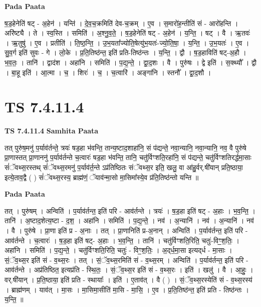 \documentclass[17pt]{extarticle}
\begin{document}
\textbf{Pada Paata} \newline

ष॒ड॒हेनेति॑ षट् - अ॒हेन॑ । यन्ति॑ । दे॒व॒च॒क्रमिति॑ देव-च॒क्रम् । ए॒व । स॒मारो॑ह॒न्तीति॑ सं - आरो॑हन्ति । अरि॑ष्ट्यै । ते । स्व॒स्ति । समिति॑ । अ॒श्नु॒व॒ते॒ । ष॒ड॒हेनेति॑ षट् - अ॒हेन॑ । य॒न्ति॒ । षट् । वै । ऋ॒तवः॑ । ऋ॒तुषु॑ । ए॒व । प्रतीति॑ । ति॒ष्ठ॒न्ति॒ । उ॒भ॒यता᳚ज्योति॒षेत्यु॑भ॒यतः॑-ज्यो॒ति॒षा॒ । य॒न्ति॒ । उ॒भ॒यतः॑ । ए॒व । सु॒व॒र्ग इति॑ सुवः - गे । लो॒के । प्र॒ति॒तिष्ठ॑न्त॒ इति॑ प्रति-तिष्ठ॑न्तः । य॒न्ति॒ । द्वौ । ष॒ड॒हाविति॑ षट्-अ॒हौ । भ॒व॒तः॒ । तानि॑ । द्वाद॑श । अहा॑नि । समिति॑ । प॒द्य॒न्ते॒ । द्वा॒द॒शः । वै । पुरु॑षः । द्वे इति॑ । स॒क्थ्यौ᳚ । द्वौ । बा॒हू इति॑ । आ॒त्मा । च॒ । शिरः॑ । च॒ । च॒त्वारि॑ । अङ्गा॑नि । स्तनौ᳚ । द्वा॒द॒शौ ।  \newline





\section{ TS 7.4.11.4 }

\textbf{TS 7.4.11.4 } \newline
\textbf{Samhita Paata} \newline

तत् पुरु॑ष॒मनु॑ प॒र्याव॑र्तन्ते॒ त्रयः॑ षड॒हा भ॑वन्ति॒ तान्य॒ष्टाद॒शाहा॑नि॒ सं प॑द्यन्ते॒ नवा॒न्यानि॒ नवा॒न्यानि॒ नव॒ वै पुरु॑षे प्रा॒णास्तत् प्रा॒णाननु॑ प॒र्याव॑र्तन्ते च॒त्वारः॑ षड॒हा भ॑वन्ति॒ तानि॒ चतु॑र्विꣳशति॒रहा॑नि॒ सं प॑द्यन्ते॒ चतु॑र्विꣳशतिरर्द्धमा॒साः सं॑ॅवथ्स॒रस्तथ् सं॑ॅवथ्स॒रमनु॑ प॒र्याव॑र्त॒न्ते ऽप्र॑तिष्ठितः संॅवथ्स॒र इति॒ खलु॒ वा आ॑हु॒र्वर्.षी॑यान् प्रति॒ष्ठाया॒ इत्ये॒ताव॒द्वै ( ) सं॑ॅवथ्स॒रस्य॒ ब्राह्म॑णं॒ ॅयाव॑न्मा॒सो मा॒सिमा᳚स्ये॒व प्र॑ति॒तिष्ठ॑न्तो यन्ति ॥ \newline

\textbf{Pada Paata} \newline

तत् । पुरु॑षम् । अन्विति॑ । प॒र्याव॑र्तन्त॒ इति॑ परि - आव॑र्तन्ते । त्रयः॑ । ष॒ड॒हा इति॑ षट् - अ॒हाः । भ॒व॒न्ति॒ । तानि॑ । अ॒ष्टाद॒शेत्य॒ष्टा - द॒श॒ । अहा॑नि । समिति॑ । प॒द्य॒न्ते॒ । नव॑ । अ॒न्यानि॑ । नव॑ । अ॒न्यानि॑ । नव॑ । वै । पुरु॑षे । प्रा॒णा इति॑ प्र - अ॒नाः । तत् । प्रा॒णानिति॑ प्र-अ॒नान् । अन्विति॑ । प॒र्याव॑र्तन्त॒ इति॑ परि - आव॑र्तन्ते । च॒त्वारः॑ । ष॒ड॒हा इति॑ षट्- अ॒हाः । भ॒व॒न्ति॒ । तानि॑ । चतु॑र्विꣳशति॒रिति॒ चतुः॑-विꣳ॒॒श॒तिः॒ । अहा॑नि । समिति॑ । प॒द्य॒न्ते॒ । चतु॑र्विꣳशति॒रिति॒ चतुः॑ - विꣳ॒॒श॒तिः॒ । अ॒द्‌र्ध॒मा॒सा इत्यद्‌र्ध - मा॒साः । सं॒ॅव॒थ्स॒र इति॑ सं - व॒थ्स॒रः । तत् । सं॒ॅव॒थ्स॒रमिति॑ सं - व॒थ्स॒रम् । अन्विति॑ । प॒र्याव॑र्तन्त॒ इति॑ परि - आव॑र्तन्ते । अप्र॑तिष्ठित॒ इत्यप्र॑ति - स्थि॒तः॒ । सं॒ॅव॒थ्स॒र इति॑ सं - व॒थ्स॒रः । इति॑ । खलु॑ । वै । आ॒हुः॒ । वर्.षी॑यान् । प्र॒ति॒ष्ठाया॒ इति॑ प्रति - स्थायाः᳚ । इति॑ । ए॒ताव॑त् । वै ( ) । सं॒ॅव॒थ्स॒रस्येति॑ सं - व॒थ्स॒रस्य॑ । ब्राह्म॑णम् । याव॑त् । मा॒सः । मा॒सिमा॒सीति॑ मा॒सि - मा॒सि॒ । ए॒व । प्र॒ति॒तिष्ठ॑न्त॒ इति॑ प्रति - तिष्ठ॑न्तः । य॒न्ति॒ ॥  \newline
\end{document}
